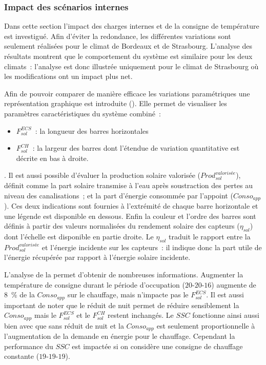 \subsubsection{Impact des scénarios internes} %
\label{ssub:impact_des_scenarios_internes}
Dans cette section l’impact des charges internes et de la consigne de température est
investigué. Afin d’éviter la redondance, les différentes variations sont seulement
réalisées pour le climat de Bordeaux et de Strasbourg. L’analyse des résultats montrent
que le comportement du système est similaire pour les deux climats~: l’analyse est donc
illustrée uniquement pour le climat de Strasbourg où les modifications ont un impact plus
net.

Afin de pouvoir comparer de manière efficace les variations paramétriques une
représentation graphique est introduite (). Elle permet
de visualiser les paramètres caractéristiques du système combiné~:
\begin{itemize}
    \item $F_{sol}^{ECS}$~: la longueur des barres horizontales
    \item $F_{sol}^{CH}$~: la largeur des barres dont l’étendue de variation quantitative
          est décrite en bas à droite.
\end{itemize}.
Il est aussi possible d’évaluer la production solaire valorisée
($Prod_{sol}^{valorisée}$), définit comme la part solaire transmise à l’eau après
soustraction des pertes au niveau des canalisations~; et la part d’énergie consommée
par l’appoint ($Conso_{app}$). Ces deux indications sont fournies à l’extrémité de chaque
barre horizontale et une légende est disponible en dessous.
Enfin la couleur et l’ordre des barres sont définis à partir des valeurs normalisées
du rendement solaire des capteurs ($\eta_{sol}$) dont l’échelle est disponible en partie droite. Le
$\eta_{sol}$ traduit le rapport entre la $Prod_{sol}^{valorisée}$ et l’énergie
incidente sur les capteurs~: il indique donc la part utile de l’énergie récupérée par rapport à
l’énergie solaire incidente.

L’analyse de la  permet d’obtenir de nombreuses
informations. Augmenter la température de consigne durant le période
d’occupation ($20$-$20$-$16$) augmente de \SI{8}{\percent} de la $Conso_{app}$
sur le chauffage, mais n’impacte pas le $F_{sol}^{ECS}$. Il est aussi important de noter que le
réduit de nuit permet de réduire sensiblement la $Conso_{app}$ mais le $F_{sol}^{ECS}$ et le
$F_{sol}^{CH}$ restent inchangés. Le $SSC$ fonctionne ainsi aussi bien avec que sans réduit de
nuit et la $Conso_{app}$ est seulement proportionnelle à l’augmentation de la demande en
énergie pour le chauffage. Cependant la performance du $SSC$ est impactée si on considère
une consigne de chauffage constante ($19$-$19$-$19$).

